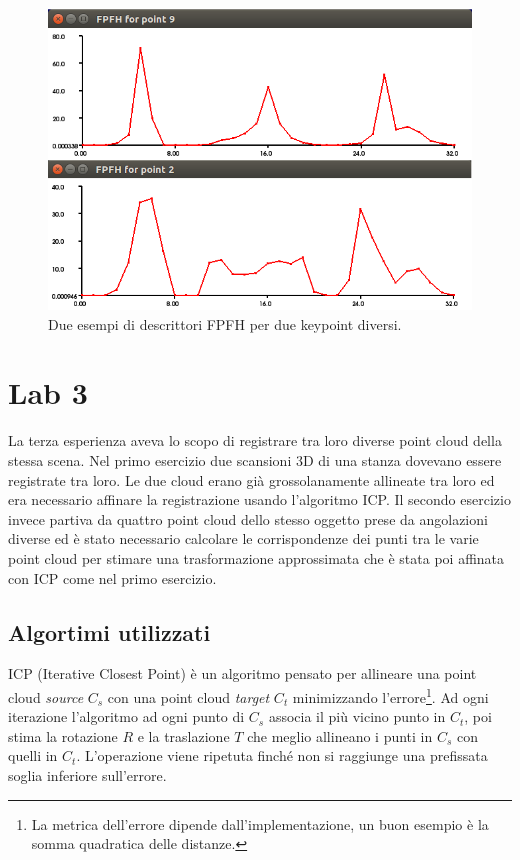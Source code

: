 \documentclass[a4paper]{article}
\begin{document}
	\begin{figure}
		\centering
		\includegraphics[width=1\textwidth]{images/lab2.png}
		\caption{\label{fig:lab2}Due esempi di descrittori FPFH per due keypoint diversi.}
	\end{figure}


\section{Lab 3} \label{sec:lab3}
La terza esperienza aveva lo scopo di registrare tra loro diverse point cloud della stessa scena. Nel primo esercizio due scansioni 3D di una stanza dovevano essere registrate tra loro. Le due cloud erano già grossolanamente allineate tra loro ed era necessario affinare la registrazione usando l'algoritmo ICP. Il secondo esercizio invece partiva da quattro point cloud dello stesso oggetto prese da angolazioni diverse ed è stato necessario calcolare le corrispondenze dei punti tra le varie point cloud per stimare una trasformazione approssimata che è stata poi affinata con ICP come nel primo esercizio.

	\subsection{Algortimi utilizzati}	\label{sec:lab3_alg}
	ICP (Iterative Closest Point) è un algoritmo pensato per allineare una point cloud \textit{source} $C_{s}$ con una point cloud \textit{target} $C_{t}$ minimizzando l'errore\footnote{La metrica dell'errore dipende dall'implementazione, un buon esempio è la somma quadratica delle distanze.}. Ad ogni iterazione l'algoritmo ad ogni punto di $C_{s}$ associa il più vicino punto in $C_{t}$, poi stima la rotazione $R$ e la traslazione $T$ che meglio allineano i punti in $C_{s}$ con quelli in  $C_{t}$. L'operazione viene ripetuta finché non si raggiunge una prefissata soglia inferiore sull'errore.
\end{document}
